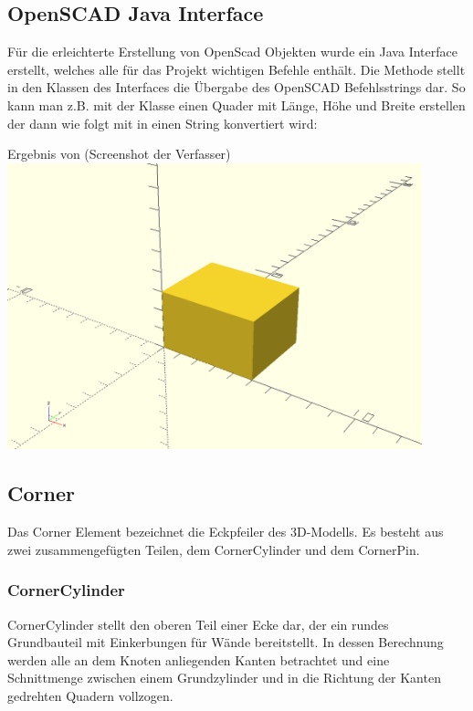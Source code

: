 \subsection{OpenSCAD Java Interface}
Für die erleichterte Erstellung von OpenScad Objekten wurde ein Java Interface  erstellt, welches alle für das Projekt wichtigen Befehle enthält.
Die Methode  stellt in den Klassen des Interfaces die Übergabe des OpenSCAD Befehlsstrings dar.
So kann man z.B. mit der Klasse  einen Quader mit Länge, Höhe und Breite erstellen der dann wie folgt mit  in einen String konvertiert wird:
\\
\begin{Bild}{Ergebnis von  (Screenshot der Verfasser)}
	\includegraphics[width = 120mm]{Bilder/Quader}
\end{Bild}

\subsection{Corner}
Das Corner Element bezeichnet die Eckpfeiler des 3D-Modells.
Es besteht aus zwei zusammengefügten Teilen, dem CornerCylinder und dem CornerPin.
\subsubsection{CornerCylinder}
CornerCylinder stellt den oberen Teil einer Ecke dar, der ein rundes Grundbauteil mit Einkerbungen für Wände bereitstellt.
In dessen Berechnung werden alle an dem Knoten anliegenden Kanten betrachtet und eine Schnittmenge zwischen einem Grundzylinder und in die Richtung der Kanten gedrehten Quadern vollzogen. 
